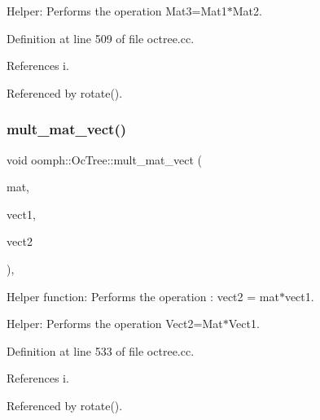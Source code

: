 Helper\+: Performs the operation Mat3=Mat1$\ast$\+Mat2. 

Definition at line 509 of file octree.\+cc.



References i.



Referenced by rotate().

\mbox{\label{classoomph_1_1OcTree_a4cb0cccaedfcb4301edcc8dc7cead639}} 
\subsubsection{\texorpdfstring{mult\+\_\+mat\+\_\+vect()}{mult\_mat\_vect()}}
{\footnotesize\ttfamily void oomph\+::\+Oc\+Tree\+::mult\+\_\+mat\+\_\+vect (\begin{DoxyParamCaption}\item[{const \hyperlink{classoomph_1_1DenseMatrix}{Dense\+Matrix}$<$ int $>$ \&}]{mat,  }\item[{const \hyperlink{classoomph_1_1Vector}{Vector}$<$ int $>$ \&}]{vect1,  }\item[{\hyperlink{classoomph_1_1Vector}{Vector}$<$ int $>$ \&}]{vect2 }\end{DoxyParamCaption})\hspace{0.3cm}{\ttfamily [static]}, {\ttfamily [private]}}



Helper function\+: Performs the operation \+: vect2 = mat$\ast$vect1. 

Helper\+: Performs the operation Vect2=Mat$\ast$\+Vect1. 

Definition at line 533 of file octree.\+cc.



References i.



Referenced by rotate().

\mbox{\label{classoomph_1_1OcTree_a43cbe5258a41168fe2d891e52ae64e6b}} 
